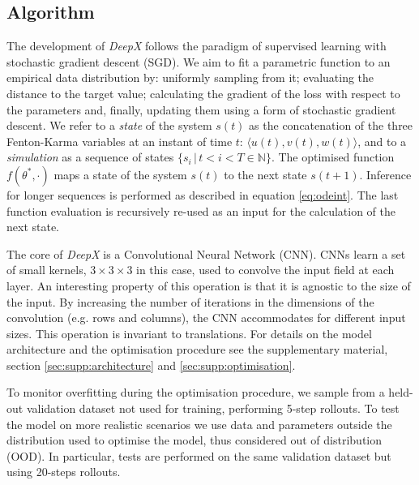 \documentclass[utf8]{frontiersSCNS} %
\begin{document}
\subsection{Algorithm}
\label{sec:algorithm}
The development of \textit{DeepX} follows the paradigm of supervised learning with stochastic gradient descent (SGD). We aim to fit a parametric function to an empirical data distribution by: uniformly sampling from it; evaluating the distance to the target value; calculating the gradient of the loss with respect to the parameters and, finally, updating them using a form of stochastic gradient descent.
We refer to a \emph{state} of the system $s(t)$ as the concatenation of the three Fenton-Karma variables at an instant of time $t$: $\langle u(t), v(t), w(t)\rangle$, and to a \emph{simulation} as a sequence of states $\{s_i \, | \, t < i < T \in \mathbb{N}\}$.
The optimised function $f(\theta^*, \cdot)$ maps a state of the system $s(t)$ to the next state $s(t+1)$.
Inference for longer sequences is performed as described in equation \eqref{eq:odeint}. The last function evaluation is recursively re-used as an input for the calculation of the next state.

The core of \textit{DeepX} is a Convolutional Neural Network (CNN). CNNs learn a set of small kernels, $3 \times 3 \times 3$ in this case, used to convolve the input field at each layer.
An interesting property of this operation is that it is agnostic to the size of the input. By increasing the number of iterations in the dimensions of the convolution (e.g. rows and columns), the CNN accommodates for different input sizes. This operation is invariant to translations.
For details on the model architecture and the optimisation procedure see the supplementary material, section \ref{sec:supp:architecture} and \ref{sec:supp:optimisation}.

To monitor overfitting during the optimisation procedure, we sample from a held-out validation dataset not used for training, performing 5-step rollouts.
To test the model on more realistic scenarios we use data and parameters outside the distribution used to optimise the model, thus considered out of distribution (OOD). In particular, tests are performed on the same validation dataset but using 20-steps rollouts. 
%        
\end{document}
